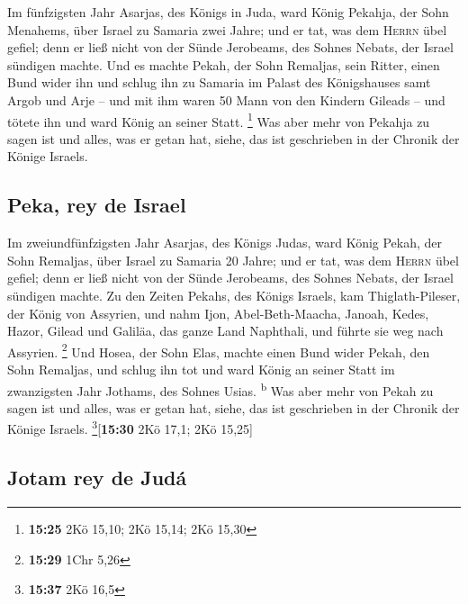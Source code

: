  Im fünfzigsten Jahr Asarjas, des Königs in Juda, ward
König Pekahja, der Sohn Menahems, über Israel zu Samaria zwei Jahre;
 und er tat, was dem \textsc{Herrn} übel gefiel; denn er
ließ nicht von der Sünde Jerobeams, des Sohnes Nebats, der Israel
sündigen machte.  Und es machte Pekah, der Sohn Remaljas,
sein Ritter, einen Bund wider ihn und schlug ihn zu Samaria im Palast
des Königshauses samt Argob und Arje -- und mit ihm waren 50 Mann von
den Kindern Gileads -- und tötete ihn und ward König an seiner Statt.
\footnote{\textbf{15:25} 2Kö 15,10; 2Kö 15,14; 2Kö 15,30}
 Was aber mehr von Pekahja zu sagen ist und alles, was er
getan hat, siehe, das ist geschrieben in der Chronik der Könige Israels.

\hypertarget{peka-rey-de-israel}{%
\subsection{Peka, rey de Israel}\label{peka-rey-de-israel}}

 Im zweiundfünfzigsten Jahr Asarjas, des Königs Judas,
ward König Pekah, der Sohn Remaljas, über Israel zu Samaria 20 Jahre;
 und er tat, was dem \textsc{Herrn} übel gefiel; denn er
ließ nicht von der Sünde Jerobeams, des Sohnes Nebats, der Israel
sündigen machte.  Zu den Zeiten Pekahs, des Königs
Israels, kam Thiglath-Pileser, der König von Assyrien, und nahm Ijon,
Abel-Beth-Maacha, Janoah, Kedes, Hazor, Gilead und Galiläa, das ganze
Land Naphthali, und führte sie weg nach Assyrien. \footnote{\textbf{15:29}
  1Chr 5,26}  Und Hosea, der Sohn Elas, machte einen Bund
wider Pekah, den Sohn Remaljas, und schlug ihn tot und ward König an
seiner Statt im zwanzigsten Jahr Jothams, des Sohnes Usias.
\textsuperscript{b}  Was aber mehr von Pekah zu sagen ist
und alles, was er getan hat, siehe, das ist geschrieben in der Chronik
der Könige Israels. \footnote{\textbf{15:37} 2Kö 16,5}{[}\textbf{15:30}
2Kö 17,1; 2Kö 15,25{]}

\hypertarget{jotam-rey-de-juduxe1}{%
\subsection{Jotam rey de Judá}\label{jotam-rey-de-juduxe1}}

